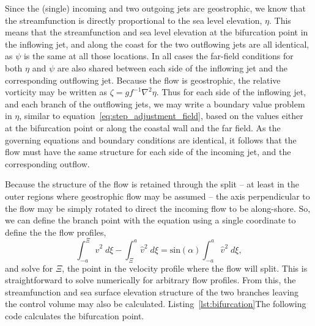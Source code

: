 \documentclass[11pt]{report}
\numberwithin{equation}{section}
\begin{document}
Since the (single) incoming and two outgoing jets are geostrophic, we know that the streamfunction is directly proportional to the sea level elevation, $\eta$.  This means that the streamfunction and sea level elevation at the bifurcation point in the inflowing jet, and along the coast for the two outflowing jets are all identical, as $\psi$ is the same at all those locations.  In all cases the far-field conditions for both $\eta$ and $\psi$ are also shared between each side of the inflowing jet and the corresponding outflowing jet.  Because the flow is geostrophic, the relative vorticity may be written as $\zeta = g f^{-1} \nabla^2 \eta$.  Thus for each side of the inflowing jet, and each branch of the outflowing jets, we may write a boundary value problem in $\eta$, similar to equation~\ref{eq:step_adjustment_field}, based on the values either at the bifurcation point or along the coastal wall and the far field.  As the governing equations and boundary conditions are identical, it follows that the flow must have the same structure for each side of the incoming jet, and the corresponding outflow.

Because the structure of the flow is retained through the split -- at least in the outer regions where geostrophic flow may be assumed -- the axis perpendicular to the flow may be simply rotated to direct the incoming flow to be along-shore.  So, we can define the branch point with the equation using a single coordinate to define the the flow profiles,
\begin{equation}
    \int_{-a}^\Xi \hat{v}^2 \;d\xi - \int_\Xi^a \hat{v}^2\;d\xi = \mathrm{sin}(\alpha) \int_{-a}^{a} \hat{v}^2\;d\xi,
\end{equation}
and solve for $\Xi$, the point in the velocity profile where the flow will split.  This is straightforward to solve numerically for arbitrary flow profiles.  From this, the streamfunction and sea surface elevation structure of the two branches leaving the control volume may also be calculated.  Listing~\ref{lst:bifurcation}The following code calculates the bifurcation point.
\end{document}
